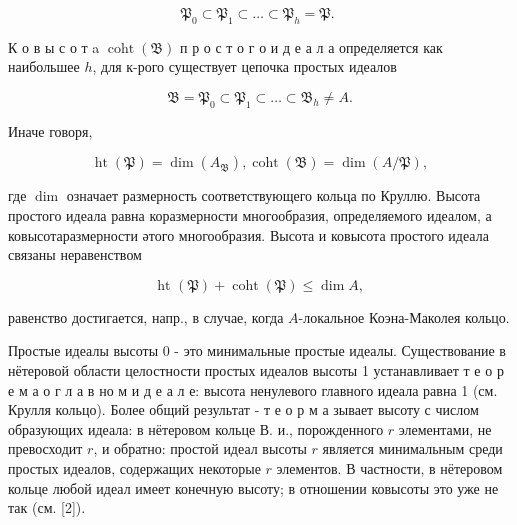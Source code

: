 \documentclass[10pt]{article}
\begin{document}
\[

\mathfrak{P}_{0} \subset \mathfrak{P}_{1} \subset \ldots \subset \mathfrak{P}_{h}=\mathfrak{P} \text {. }

\]



К о в ы с о т a $\operatorname{coht}(\mathfrak{B})$ п р о с т о г о и д е а л а определяется как наибольшее $h$, для к-рого существует цепочка простых идеалов



\[

\mathfrak{B}=\mathfrak{P}_{0} \subset \mathfrak{P}_{1} \subset \ldots \subset \mathfrak{B}_{h} \neq A .

\]



Иначе говоря,



\[

\operatorname{ht}(\mathfrak{P})=\operatorname{dim}\left(A_{\mathfrak{B}}\right), \operatorname{coht}(\mathfrak{B})=\operatorname{dim}(A / \mathfrak{P}),

\]



где $\operatorname{dim}$ означает размерность соответствующего кольца по Круллю. Высота простого идеала равна коразмерности многообразия, определяемого идеалом, а ковысотаразмерности әтого многообразия. Высота и ковысота простого идеала связаны неравенством



\[

\text { ht }(\mathfrak{P})+\operatorname{coht}(\mathfrak{P}) \leqslant \operatorname{dim} A \text {, }

\]



равенство достигается, напр., в случае, когда $A$-локальное Коэна-Маколея кольцо.



Простые идеалы высоты 0 - это минимальные простые идеалы. Существование в нётеровой области целостности простых идеалов высоты 1 устанавливает т е о р е м а о г л а в но м и д е а л е: высота ненулевого главного идеала равна 1 (см. Крулля кольцо). Более общий результат - т е о р м а зывает высоту с числом образующих идеала: в нётеровом кольце В. и., порожденного $r$ элементами, не превосходит $r$, и обратно: простой идеал высоты $r$ является минимальным среди простых идеалов, содержащих некоторые $r$ элементов. В частности, в нётеровом кольце любой идеал имеет конечную высоту; в отношении ковысоты это уже не так (см. [2]).
\end{document}
